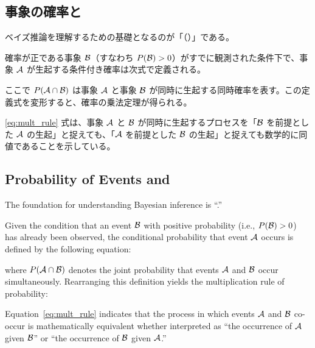 \ifja
    \subsection{事象の確率と\jaTextConditionalProbability }
    ベイズ推論を理解するための基礎となるのが「\jaTextConditionalProbability（\fullTextConditionalProbability）」である。

    確率が正である事象 $\mathcal{B}$（すなわち $P( \mathcal{B} ) > 0$）がすでに観測された条件下で、事象 $\mathcal{A}$ が生起する条件付き確率は次式で定義される。

    

    ここで $P( \mathcal{A} \cap \mathcal{B} )$ は事象 $\mathcal{A}$ と事象 $\mathcal{B}$ が同時に生起する同時確率を表す。この定義式を変形すると、確率の乗法定理が得られる。

    

    \eqref{eq:mult_rule} 式は、事象 $\mathcal{A}$ と $\mathcal{B}$ が同時に生起するプロセスを「$\mathcal{B}$ を前提とした $\mathcal{A}$ の生起」と捉えても、「$\mathcal{A}$ を前提とした $\mathcal{B}$ の生起」と捉えても数学的に同値であることを示している。
\else
    \subsection{Probability of Events and \fullTextConditionalProbability}
    The foundation for understanding Bayesian inference is ``\fullTextConditionalProbability.''

    Given the condition that an event $\mathcal{B}$ with positive probability (i.e., $P( \mathcal{B} ) > 0$) has already been observed, the conditional probability that event $\mathcal{A}$ occurs is defined by the following equation:

    

    where $P( \mathcal{A} \cap \mathcal{B} )$ denotes the joint probability that events $\mathcal{A}$ and $\mathcal{B}$ occur simultaneously. Rearranging this definition yields the multiplication rule of probability:

    

    Equation~\eqref{eq:mult_rule} indicates that the process in which events $\mathcal{A}$ and $\mathcal{B}$ co-occur is mathematically equivalent whether interpreted as ``the occurrence of $\mathcal{A}$ given $\mathcal{B}$'' or ``the occurrence of $\mathcal{B}$ given $\mathcal{A}$.''
\fi

